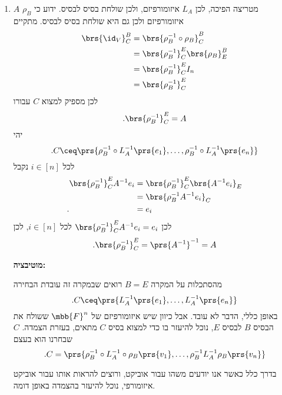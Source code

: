 \documentclass[a4paper,10pt,oneside,openany]{article}
\begin{document}
\begin{solution}
\begin{enumerate}
\item%
$A$
מטריצה הפיכה, לכן
$L_A$
איזומורפיזם, ולכן שולחת בסיס לבסיס.
ידוע כי
$\rho_B$
איזומורפיזם ולכן גם היא שולחת בסיס לבסיס.
מתקיים
\begin{align*}
\brs{\id_V}^B_C &= \brs{\rho_B^{-1} \circ \rho_B}^B_C
\\&= \brs{\rho_B^{-1}}^E_C \brs{\rho_B}^B_E
\\&= \brs{\rho_B^{-1}}^E_C I_n
\\&= \brs{\rho_B^{-1}}^E_C
\end{align*}
לכן מספיק למצוא
$C$
עבורו
\[\text{.} \brs{\rho_B^{-1}}^E_C = A\]
יהי
\[\text{.} C \ceq \prs{\rho_B^{-1} \circ L_A^{-1}\prs{e_1}, \ldots, \rho_B^{-1} \circ L_A^{-1}\prs{e_n}}\]
לכל
$i \in [n]$
נקבל
\begin{align*}
\brs{\rho_B^{-1}}^E_C A^{-1} e_i &= \brs{\rho_B^{-1}}^E_C \brs{A^{-1} e_i}_E
\\&= \brs{\rho_B^{-1} A^{-1} e_i}_C
\\\text{.} \hphantom{\brs{\rho_B^{-1}}^E_C A^{-1} e_i} &= e_i
\end{align*}
לכן
$\brs{\rho_B^{-1}}^E_C A^{-1} e_i = e_i$
לכל
$i \in [n]$,
לכן
\[\text{.} \brs{\rho_B^{-1}}^E_C = \prs{A^{-1}}^{-1} = A\]

\textbf{מוטיבציה:}

מהסתכלות על המקרה
$B = E$
רואים שבמקרה זה עובדת הבחירה
\[\text{.} C \ceq \prs{L_A^{-1}\prs{e_1}, \ldots, L_A^{-1}\prs{e_n}}\]
באופן כללי, הדבר לא עובד. אבל כיוון שיש איזומורפיזם של
$\mbb{F}^n$
ששולח את הבסיס
$B$
לבסיס
$E$,
נוכל להיעזר בו כדי למצוא בסיס
$C$
מתאים, בעזרת הצמדה.
$C$
שבחרנו הוא בעצם
\[\text{.} C = \prs{\rho_B^{-1} \circ L_A^{-1} \circ \rho_B\prs{v_1}, \ldots, \rho_B^{-1} L_A^{-1} \rho_B\prs{v_n}}\]

בדרך כלל כאשר אנו יודעים משהו עבור אוביקט, ורוצים להראות אותו עבור אוביקט איזומורפי, נוכל להיעזר בהצמדה באופן דומה.


\end{enumerate}
\end{solution}
\end{document}
